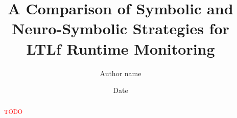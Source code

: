 \documentclass{article}
\title{A Comparison of Symbolic and Neuro-Symbolic Strategies for LTLf Runtime Monitoring}
\author{Author name}
\date{Date}
\begin{document}
\maketitle

\begin{abstract}
\textcolor{red}{TODO}
\end{abstract}










 


\clearpage
\appendix

\end{document}
